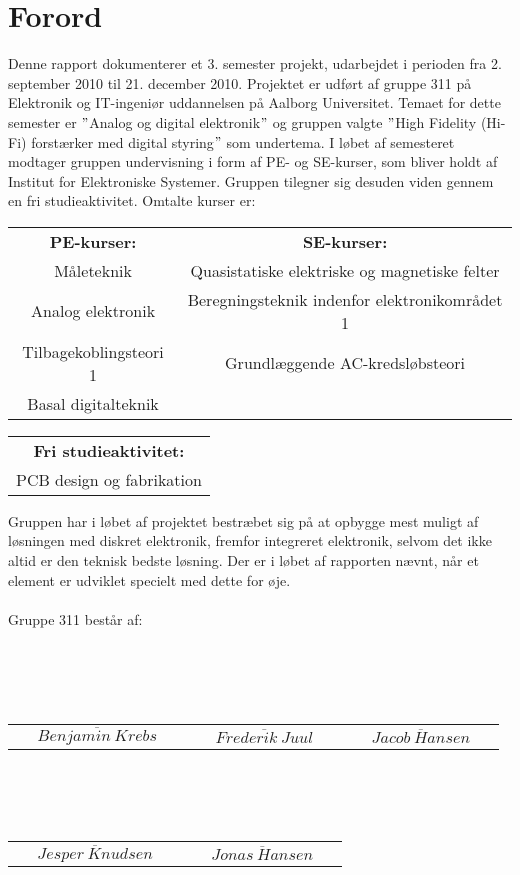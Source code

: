 \chapter*{Forord}
\label{forord}
Denne rapport dokumenterer et 3. semester projekt, udarbejdet i perioden fra 2. september 2010 til 21. december 2010. Projektet er udført af gruppe 311 på Elektronik og IT-ingeniør uddannelsen på Aalborg Universitet. Temaet for dette semester er $"$Analog og digital elektronik$"$ og gruppen valgte $"$High Fidelity (Hi-Fi) forstærker med digital styring$"$ som undertema. I løbet af semesteret modtager gruppen undervisning i form af PE- og SE-kurser, som bliver holdt af Institut for Elektroniske Systemer. Gruppen tilegner sig desuden viden gennem en fri studieaktivitet. Omtalte kurser er:

\begin{table}[h]
\centering
\begin{tabular}{c c}
\textbf{PE-kurser:} & \textbf{SE-kurser:} \\
Måleteknik & Quasistatiske elektriske og magnetiske felter \\
Analog elektronik & Beregningsteknik indenfor elektronikområdet 1 \\
Tilbagekoblingsteori 1 & Grundlæggende AC-kredsløbsteori \\
Basal digitalteknik & \\
\end{tabular}
\label{tab:kurser1}
\end{table}
\begin{table}[h]
\centering
\begin{tabular}{c}
\textbf{Fri studieaktivitet:} \\
PCB design og fabrikation \\
\end{tabular}
\label{tab:kurser2}
\end{table}
Gruppen har i løbet af projektet bestræbet sig på at opbygge mest muligt af løsningen med diskret elektronik, fremfor integreret elektronik, selvom det ikke altid er den teknisk bedste løsning. Der er i løbet af rapporten nævnt, når et element er udviklet specielt med dette for øje.\\\\
Gruppe 311 består af: \\\\\\\\\\
\begin{table}[h]
\centering
\begin{tabular}{c c c}
$\overline{~~~~~~Benjamin~Krebs~~~~~~}$ & $\overline{~~~~~~Frederik~Juul~~~~~~}$ & $\overline{~~~~~~Jacob~Hansen~~~~~~}$\\
\end{tabular}
\label{tab:gruppemedlemmer1}
\end{table} \\\\\\
\begin{table}[h]
\centering
\begin{tabular}{c c}
$\overline{~~~~~~Jesper~Knudsen~~~~~~}$ & $\overline{~~~~~~Jonas~Hansen~~~~~~}$\\
\end{tabular}
\label{tab:gruppemedlemmer2}
\end{table}